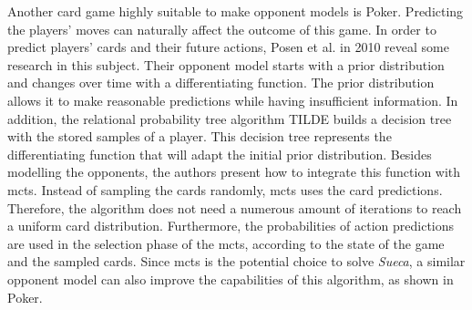 Another card game highly suitable to make opponent models is Poker.
Predicting the players' moves can naturally affect the outcome of this game.
In order to predict players' cards and their future actions, Posen et al. in 2010 reveal some research in this subject.
Their opponent model starts with a prior distribution and changes over time with a differentiating function.
The prior distribution allows it to make reasonable predictions while having insufficient information.
In addition, the relational probability tree algorithm TILDE builds a decision tree with the stored samples of a player.
This decision tree represents the differentiating function that will adapt the initial prior distribution.
Besides modelling the opponents, the authors present how to integrate this function with \gls{mcts}.
Instead of sampling the cards randomly, \gls{mcts} uses the card predictions.
Therefore, the algorithm does not need a numerous amount of iterations to reach a uniform card distribution.
Furthermore, the probabilities of action predictions are used in the selection phase of the \gls{mcts}, according to the state of the game and the sampled cards.
Since \gls{mcts} is the potential choice to solve \emph{Sueca}, a similar opponent model can also improve the capabilities of this algorithm, as shown in Poker.

 